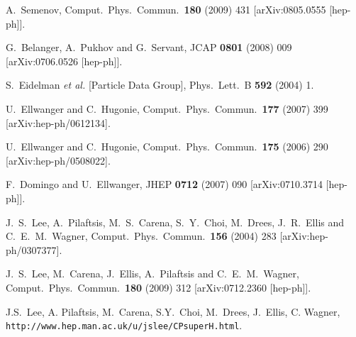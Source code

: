 \documentclass[12pt,a4paper]{article}
\begin{document}
\begin{thebibliography}{}
  A.~Semenov,
  Comput.\ Phys.\ Commun.\  {\bf 180} (2009) 431
  [arXiv:0805.0555 [hep-ph]].

  G.~Belanger, A.~Pukhov and G.~Servant,
  JCAP {\bf 0801} (2008) 009
  [arXiv:0706.0526 [hep-ph]].

  S.~Eidelman {\it et al.}  [Particle Data Group],
  Phys.\ Lett.\  B {\bf 592} (2004) 1.



  U.~Ellwanger and C.~Hugonie,
  Comput.\ Phys.\ Commun.\  {\bf 177} (2007) 399
  [arXiv:hep-ph/0612134].
  
  U.~Ellwanger and C.~Hugonie,
  Comput.\ Phys.\ Commun.\  {\bf 175} (2006) 290
  [arXiv:hep-ph/0508022].
  
  F.~Domingo and U.~Ellwanger,
  JHEP {\bf 0712} (2007) 090
  [arXiv:0710.3714 [hep-ph]].
  
  
  J.~S.~Lee, A.~Pilaftsis, M.~S.~Carena, S.~Y.~Choi, M.~Drees, J.~R.~Ellis and C.~E.~M.~Wagner,
  Comput.\ Phys.\ Commun.\  {\bf 156} (2004) 283
  [arXiv:hep-ph/0307377].

  J.~S.~Lee, M.~Carena, J.~Ellis, A.~Pilaftsis and C.~E.~M.~Wagner,
  Comput.\ Phys.\ Commun.\  {\bf 180} (2009) 312
  [arXiv:0712.2360 [hep-ph]].
  
  J.S.~Lee, A. Pilaftsis, M.~Carena, S.Y.~Choi, M.~Drees, J.~Ellis, C. Wagner,\\
  \verb|http://www.hep.man.ac.uk/u/jslee/CPsuperH.html|.
  

\end{thebibliography}
\end{document}

